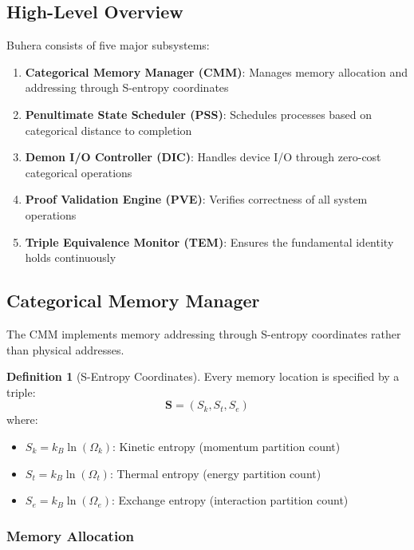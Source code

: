\documentclass[twocolumn,10pt]{article}
\theoremstyle{definition}
\newtheorem{definition}[theorem]{Definition}
\theoremstyle{remark}
\newcommand{\Scoord}{\mathbf{S}}
\begin{document}
\subsection{High-Level Overview}

Buhera consists of five major subsystems:

\begin{enumerate}
    \item \textbf{Categorical Memory Manager (CMM)}: Manages memory allocation and addressing through S-entropy coordinates
    \item \textbf{Penultimate State Scheduler (PSS)}: Schedules processes based on categorical distance to completion
    \item \textbf{Demon I/O Controller (DIC)}: Handles device I/O through zero-cost categorical operations
    \item \textbf{Proof Validation Engine (PVE)}: Verifies correctness of all system operations
    \item \textbf{Triple Equivalence Monitor (TEM)}: Ensures the fundamental identity holds continuously
\end{enumerate}

\subsection{Categorical Memory Manager}

The CMM implements memory addressing through S-entropy coordinates rather than physical addresses.

\begin{definition}[S-Entropy Coordinates]
Every memory location is specified by a triple:
\begin{equation}
    \Scoord = (S_k, S_t, S_e)
\end{equation}
where:
\begin{itemize}
    \item $S_k = k_B \ln(\Omega_k)$: Kinetic entropy (momentum partition count)
    \item $S_t = k_B \ln(\Omega_t)$: Thermal entropy (energy partition count)
    \item $S_e = k_B \ln(\Omega_e)$: Exchange entropy (interaction partition count)
\end{itemize}
\end{definition}

\subsubsection{Memory Allocation}
\end{document}
